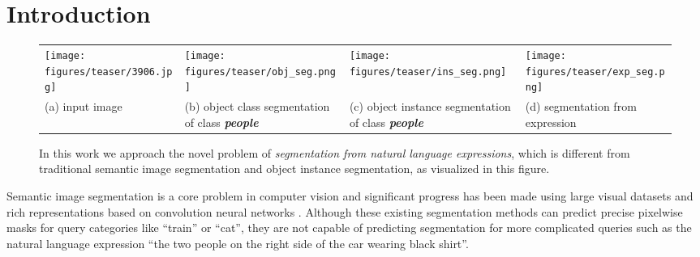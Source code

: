 \documentclass[runningheads]{llncs}
\begin{document}
\section{Introduction}

\begin{figure}[t]
\centering
\begin{tabularx}{\linewidth}{YYYY}
\texttt{[image: figures/teaser/3906.jpg]} &
\texttt{[image: figures/teaser/obj\_seg.png]} &
\texttt{[image: figures/teaser/ins\_seg.png]} &
\texttt{[image: figures/teaser/exp\_seg.png]} \\
(a) input image &
(b) object class segmentation of class \textbf{\textit{people}} &
(c) object instance segmentation of class \textbf{\textit{people}} &
(d) segmentation from expression  \\
\end{tabularx}
\caption{In this work we approach the novel problem of \emph{segmentation from natural language expressions}, which is different from traditional semantic image segmentation and object instance segmentation, as visualized in this figure.}
\label{fig:teaser}
\end{figure}

Semantic image segmentation is a core problem in computer vision and significant progress has been made using large visual datasets and rich representations based on convolution neural networks \cite{long2015fully,carreira2012semantic,chen2014semantic,zheng2015conditional,noh2015learning,yu2015multi}. Although these existing segmentation methods can predict precise pixelwise masks for query categories like ``train'' or ``cat'', they are not capable of predicting segmentation for more complicated queries such as the natural language expression ``the two people on the right side of the car wearing black shirt''.
\end{document}
